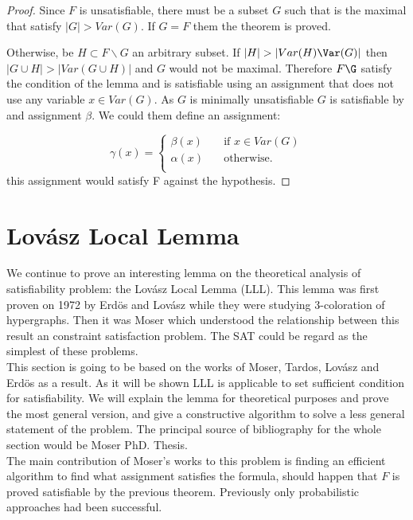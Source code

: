 \begin{proof}
  Since $F$ is unsatisfiable, there must be a subset $G$ such that is the maximal that satisfy $|G| > Var(G)$. If $G=F$ them the theorem is proved.


  Otherwise, be $H \subset F\backslash G$ an arbitrary subset. If $|H| > |Var(H)\Var(G)|$ then $|G \cup H| > |Var(G\cup H)|$ and $G$ would not be maximal.  Therefore $F\G$ satisfy the condition of the lemma and is satisfiable using an assignment that does not use any variable $x \in Var(G)$. As $G$ is minimally unsatisfiable $G$ is satisfiable by and assignment $\beta$. We could them define an assignment:

  \[   
\gamma(x) = 
     \begin{cases}
       \beta(x) &\quad\text{if } x \in Var(G)\\
       \alpha(x) &\quad\text{otherwise.} \\ 
     \end{cases}
   \]
this assignment would satisfy F against the hypothesis.
\end{proof}




\section{Lovász Local Lemma}
We continue to prove an interesting lemma on the theoretical analysis of satisfiability problem: the Lovász Local Lemma (LLL). This lemma was first proven on 1972 by Erdös and Lovász while they were studying 3-coloration of hypergraphs. Then it was Moser which understood the relationship between  this result an constraint satisfaction problem. The SAT could be regard as the simplest of these problems. \\


 
This section is going to be based on the works of Moser, Tardos, Lovász and Erdös as a result. As it will be shown LLL is applicable to set sufficient condition for satisfiability.  We will explain the lemma for theoretical purposes and prove the most general version, and give a constructive algorithm to solve a less general statement of the problem. The principal source of bibliography for the whole section would be Moser PhD. Thesis. \\ 


The main contribution of Moser's works to this problem is finding an efficient algorithm to find what assignment satisfies the formula, should happen that $F$ is proved satisfiable by the previous theorem. Previously only probabilistic approaches had been successful.\\


